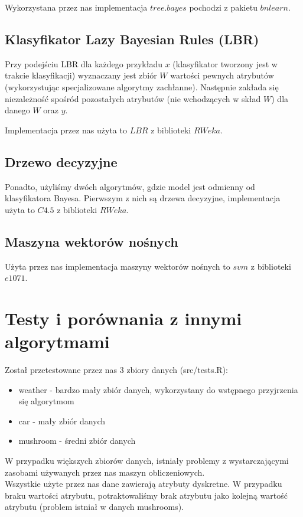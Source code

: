 \documentclass[16]{article}
\begin{document}
Wykorzystana przez nas implementacja $tree.bayes$ pochodzi z pakietu $bnlearn$.
 
\subsection{Klasyfikator Lazy Bayesian Rules (LBR)}
Przy podejściu LBR dla każdego przykładu $x$ (klasyfikator tworzony jest w trakcie klasyfikacji) wyznaczany jest zbiór $W$ wartości pewnych atrybutów (wykorzystując specjalizowane algorytmy zachłanne). Następnie zakłada się niezależność spośród pozostałych atrybutów (nie wchodzących w skład $W$) dla danego $W$ oraz $y$. 
 
Implementacja przez nas użyta to $LBR$ z biblioteki $RWeka$. 
 
\subsection{Drzewo decyzyjne}
Ponadto, użyliśmy dwóch algorytmów, gdzie model jest odmienny od klasyfikatora Bayesa. Pierwszym z nich są drzewa decyzyjne, implementacja użyta to $C4.5$ z biblioteki $RWeka$.

\subsection{Maszyna wektorów nośnych}
Użyta przez nas implementacja maszyny wektorów nośnych to $svm$ z biblioteki $e1071$.

\section{Testy i porównania z innymi algorytmami}
Został przetestowane przez nas 3 zbiory danych (src/tests.R): 
\begin{itemize}
\item weather - bardzo mały zbiór danych, wykorzystany do wstępnego przyjrzenia się algorytmom 
\item car - mały zbiór danych
\item mushroom - średni zbiór danych
\end{itemize}
W przypadku większych zbiorów danych, istniały problemy z wystarczającymi zasobami używanych przez nas maszyn obliczeniowych. \\

Wszystkie użyte przez nas dane zawierają atrybuty dyskretne. W przypadku braku wartości atrybutu, potraktowaliśmy brak atrybutu jako kolejną wartość atrybutu (problem istniał w danych mushrooms).\\
\end{document}
